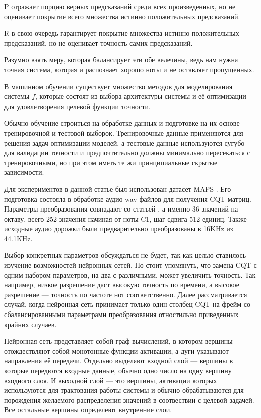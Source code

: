 P отражает порцию верных предсказаний среди всех произведенных, но не оценивает
покрытие всего множества истинно положительных предсказаний.

R в свою очередь гарантирует покрытие множества истинно положительных
предсказаний, но не оценивает точность самих предсказаний.

Разумно взять меру, которая балансирует эти обе велечины, ведь нам нужна
точная система, которая и распознает хорошо ноты и не оставляет пропущенных.

В машинном обучении существует множество методов для моделирования системы
$f$, которые состоят из выбора архитектуры системы и её оптимизации
для удовлетворения целевой функции точности.

Обычно обучение строиться на обработке данных и подготовке на их основе
тренировочной и тестовой выборок. Тренировочные данные применяются
для решения задач оптимизации моделей, а тестовые данные используются сугубо
для валидации точности и предпочтительно должны минимально пересекаться
с тренировочными, но при этом иметь те жи принципиальные скрытые зависимости.

Для экспериментов в данной статье был использован датасет MAPS \cite{L:MAPS}.
Его подготовка состояла в обработке аудио wav-файлов для получения
CQT матриц. Параметры преобразования совпадают со статьей \cite{SBETENN},
а именно 36 значений на октаву, всего 252 значения начиная от ноты C1,
шаг сдвига 512 единиц. Также исходные аудио дорожки были предварительно
преобразованы в 16KHz из 44.1KHz.

Выбор конкретных параметров обсуждаться не будет, так как целью ставилось
изучение возможностей нейронных сетей. Но стоит упомянуть, что замена
CQT с одним набором параметров, на два с различными, может увеличить точность.
Так например, низкое разрешение даст высокую точность по времени,
а высокое разрешение --- точность по частоте нот соответственно.
Далее рассматривается случай, когда нейронная сеть принимает
только один столбец CQT на фрейм со сбалансированными параметрами
преобразования отностильно приведенных крайних случаев.

Нейронная сеть представляет собой граф вычислений, в котором вершины
отождествляют собой монотонные функции активации, а дуги указывают
направления её передачи. Отдельно выделяют входной слой --- вершины
в которые передются входные данные, обычно одно число на одну вершину
входного слоя. И выходной слой --- это вершины, активации которых используются
для трактования работы системы и обычно обрабатываются для порождения
желаемого распределения значений в соотвествии с целевой задачей.
Все остальные вершины определеют внутренние слои.

